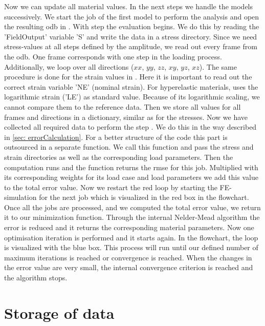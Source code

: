 Now we can update all material values. In the next steps we handle the models successively. We start the job of the first model to perform the  analysis and open the resulting \acrshort{odb} in . With step  the evaluation begins. We do this by reading the 'FieldOutput' variable 'S' and write the data in a stress directory. Since we need stress-values at all steps defined by the amplitude, we read out every frame from the \acrshort{odb}. One frame corresponds with one step in the loading process. Additionally, we loop over all directions ($xx$, $yy$, $zz$, $xy$, $yz$, $xz$). The same procedure is done for the strain values in . Here it is important to read out the correct strain variable 'NE' (nominal strain). For hyperelastic materials,  uses the logarithmic strain ('LE') as standard value. Because of its logarithmic scaling, we cannot compare them to the reference data. Then we store all values for all frames and directions in a dictionary, similar as for the stresses. Now we have collected all required data to perform the step . We do this in the way described in \autoref{sec: errorCalculation}. For a better structure of the code this part is outsourced in a separate function. We call this function and pass the stress and strain directories as well as the corresponding load parameters. Then the computation runs and the function returns the \acrshort{rmse} for this job. Multiplied with its corresponding weights for its load case and load parameters we add this value to the total error value. Now we restart the red loop by starting the FE-simulation for the next job which is visualized in the red box in the flowchart. Once all the jobs are processed, and we computed the total error value, we return it to our minimization function. Through the internal Nelder-Mead algorithm the error is reduced and it returns the corresponding material parameters. Now one optimisation iteration is performed and it starts again. In the flowchart, the loop is visualized with the blue box. This process will run until our defined number of maximum iterations is reached or convergence is reached. When the changes in the error value are very small, the internal convergence criterion is reached and the algorithm stops.


\section{Storage of data} \label{sec: dataStorage}

